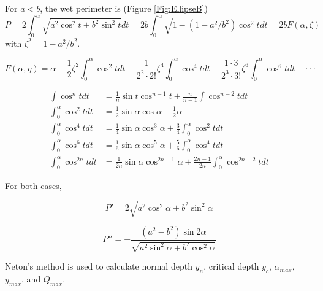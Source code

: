 For $a < b$, the wet perimeter is (Figure \ref{Fig:EllipseB})
\begin{equation}
P =  2\int _0 ^{\alpha } \sqrt{a^2\cos^2t + b^2\sin^2t} dt = 2b\int _0 ^{\alpha } \sqrt{1 - \left(1 - a^2/b^2\right) \cos^2t} dt =  2bF(\alpha, \zeta)
\end{equation}
with $\zeta^2 = 1 - a^2/b^2$.

\begin{equation}
F(\alpha, \eta) = \alpha - \frac{1}{2}\zeta^2\int_0^{\alpha} \cos ^2 t dt - \frac{1}{2^2 \cdot 2!}\zeta^4\int_0^{\alpha} \cos ^4 t dt - \frac{1 \cdot 3}{2^3 \cdot 3!}\zeta^6\int_0^{\alpha} \cos ^6 t dt - \cdot \cdot \cdot
\end{equation}

\begin{equation}
\begin{aligned}
\int \cos^n t dt &= \frac{1}{n} \sin t  \cos^{n-1} t + \frac{n}{n-1} \int \cos^{n-2} t dt \\
\int_0^\alpha \cos^2 t dt &= \frac{1}{2}\sin \alpha  \cos \alpha + \frac{1}{2} \alpha  \\
\int_0^\alpha \cos^4 t dt &= \frac{1}{4}\sin \alpha  \cos^3 \alpha + \frac{3}{4} \int_0^\alpha \cos^2 t dt \\
\int_0^\alpha \cos^6 t dt &= \frac{1}{6}\sin \alpha  \cos^5 \alpha + \frac{5}{6} \int_0^\alpha \cos^4 t dt \\
\int_0^\alpha \cos^{2n} t dt &= \frac{1}{2n}\sin \alpha  \cos^{2n-1} \alpha + \frac{2n-1}{2n} \int_0^\alpha \cos^{2n-2} t dt 
\end{aligned}
\end{equation}

For both cases,

\begin{equation}
P' = 2\sqrt{a^2\cos^2\alpha + b^2\sin^2\alpha} 
\end{equation}

\begin{equation}
P'' =-\frac{(a^2-b^2)\sin2\alpha}{\sqrt{a^2\sin^2\alpha + b^2\cos^2\alpha}} 
\end{equation}

\noindent Neton's method is used to calculate normal depth $y_n$,  critical depth $y_c$, $\alpha_{max}$, $y_{max}$, and $Q_{max}$.


